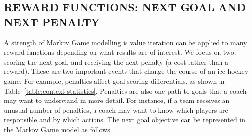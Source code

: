 \documentclass[]{article}
\begin{document}












\subsection{REWARD FUNCTIONS: NEXT GOAL AND NEXT PENALTY}
\label{subsec:reward}

A strength of Markov Game modelling is value iteration can be applied to many reward functions depending on what results are of interest.
We focus on two: scoring the next goal, and receiving the next penalty (a cost rather than a reward).
These are two important events that change the course of an ice hockey game.
For example, penalties affect goal scoring differentials, as shown in Table~\ref{table:context-statistics}.
Penalties are also one path to goals that a coach may want to understand in more detail.
For instance, if a team receives an unusual number of penalties, a coach may want to know which players are responsible and by which actions.
The next goal objective can be represented in the Markov Game model as follows.
\end{document}
